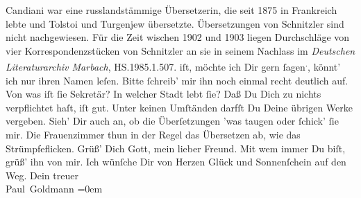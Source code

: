 \begin{ledgroupsized}[t]{13cm}
{{{                     Candiani war eine russlandstämmige
                  Übersetzerin, die seit 1875 in Frankreich lebte und Tolstoi und
                     Turgenjew übersetzte. Übersetzungen von
                     Schnitzler sind nicht nachgewiesen. Für
                  die Zeit wischen 1902 und 1903
                  liegen Durchschläge von vier Korrespondenzstücken von Schnitzler an sie in seinem Nachlass im \emph{Deutschen Literaturarchiv Marbach},
                  HS.1985.1.507.}}}\label{K_L02739-4h} iſt, möchte ich Dir gern ſagen\substVorne{}\textsuperscript{.}\substDazwischen{},\substHinten{} könnt’ ich nur ihren Namen leſen. Bitte ſchreib’ mir ihn noch einmal recht
               deutlich auf. Von was iſt ſie Sekretär? In welcher Stadt lebt ſie? Daß Du Dich zu nichts verpflichtet
               haſt, iſt gut. Unter keinen Umſtänden {\pb}darfſt Du
               Deine übrigen Werke vergeben. Sieh’ Dir auch an, ob die Überſetzungen ’was taugen
               oder ſchick’ ſie mir. Die Frauenzimmer thun in der Regel das Übersetzen ab, wie das
               Strümpfeflicken.\pend
           \pstart
           Grüß’ Dich Gott, mein lieber Freund. Mit wem immer Du biſt, grüß’ ihn von mir. Ich
               wünſche Dir von Herzen Glück und Sonnenſchein auf den Weg.\pend
           \pstart
           Dein treuer {\\[\baselineskip]}\spacefill\mbox{Paul Goldmann}\pend
           \leftskip=0em{}
         
         \endnumbering{}\end{ledgroupsized}  \newcommand{\dateiname}{L02739}\newcommand{\titel}{Paul Goldmann an Arthur Schnitzler, 6. 7. [1895]}\newcommand{\editorInnen}{Martin Anton Müller und Laura Untner}
      